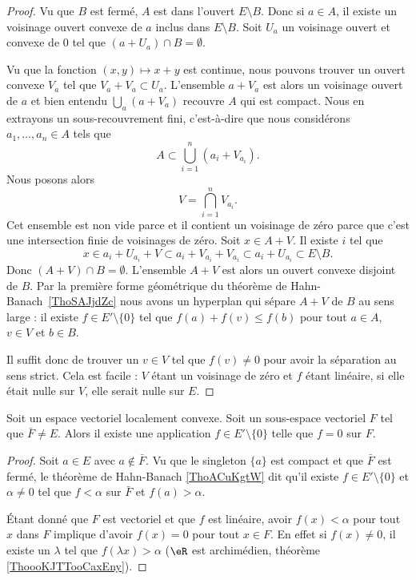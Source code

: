 \begin{proof}
	Vu que \( B\) est fermé, \( A\) est dans l'ouvert \( E\setminus B\). Donc si \( a\in A\), il existe un voisinage ouvert convexe de \( a\) inclus dans \( E\setminus B\). Soit \( U_a\) un voisinage ouvert et convexe de \( 0\) tel que \( (a+U_a)\cap B=\emptyset\).

	Vu que la fonction \( (x,y)\mapsto x+y\) est continue, nous pouvons trouver un ouvert convexe \( V_a\) tel que \( V_a+V_a\subset U_a\). L'ensemble \( a+V_a\) est alors un voisinage ouvert de \( a\) et bien entendu \( \bigcup_a(a+V_a)\) recouvre \( A\) qui est compact. Nous en extrayons un sous-recouvrement fini, c'est-à-dire que nous considérons \( a_1,\ldots, a_n\in A\) tels que
	\begin{equation}
		A\subset \bigcup_{i=1}^n(a_i+V_{a_i}).
	\end{equation}
	Nous posons alors
	\begin{equation}
		V=\bigcap_{i=1}^nV_{a_i}.
	\end{equation}
	Cet ensemble est non vide parce et il contient un voisinage de zéro parce que c'est une intersection finie de voisinages de zéro. Soit \( x\in A+V\). Il existe \( i\) tel que
	\begin{equation}
		x\in a_i+U_{a_i}+V\subset a_i+V_{a_i}+V_{a_i}\subset a_i+U_{a_i}\subset E\setminus B.
	\end{equation}
	Donc \( (A+V)\cap B=\emptyset\). L'ensemble \( A+V\) est alors un ouvert convexe disjoint de \( B\). Par la première forme géométrique du théorème de Hahn-Banach~\ref{ThoSAJjdZc} nous avons un hyperplan qui sépare \( A+V\) de \( B\) au sens large : il existe \( f\in E'\setminus\{ 0 \}\) tel que \( f(a)+f(v)\leq f(b)\) pour tout \( a\in A\), \( v\in V\) et \( b\in B\).

	Il suffit donc de trouver un \( v\in V\) tel que \( f(v)\neq 0\) pour avoir la séparation au sens strict. Cela est facile : \( V\) étant un voisinage de zéro et \( f\) étant linéaire, si elle était nulle sur \( V\), elle serait nulle sur \( E\).
\end{proof}

\begin{corollary}		\label{CORooHTZVooFhgrSN}
	Soit un espace vectoriel localement convexe. Soit un sous-espace vectoriel \( F\) tel que \( \bar F\neq E\). Alors il existe une application \( f\in E'\setminus\{ 0 \}\) telle que \( f=0\) sur \( F\).
\end{corollary}

\begin{proof}
	Soit \( a\in E\) avec \( a\notin \bar F\). Vu que le singleton \( \{ a \}\) est compact et que \( \bar F\) est fermé, le théorème de Hahn-Banach \ref{ThoACuKgtW} dit qu'il existe \( f\in E'\setminus\{ 0 \}\) et \( \alpha\neq 0\) tel que \( f<\alpha\) sur \( \bar F\) et \( f(a)>\alpha\).

	Étant donné que \( F\) est vectoriel et que \( f\) est linéaire, avoir \( f(x)<\alpha\) pour tout \( x\) dans \( F\) implique d'avoir \( f(x)=0\) pour tout \( x\in F\). En effet si \( f(x)\neq 0\), il existe un \( \lambda\) tel que \( f(\lambda x)>\alpha\) (\( \eR\) est archimédien, théorème \ref{ThoooKJTTooCaxEny}).
\end{proof}

